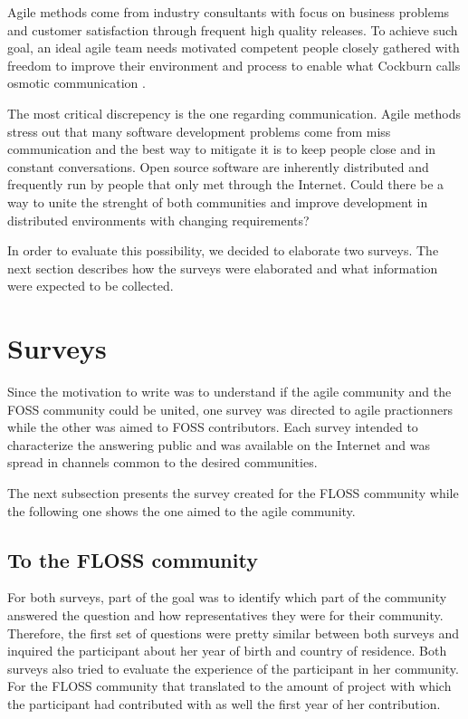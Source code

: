 \documentclass[lnbip]{svmultln}
\begin{document}
Agile methods come from industry consultants with focus on business
problems and customer satisfaction through frequent high quality
releases. To achieve such goal, an ideal agile team needs motivated
competent people closely gathered with freedom to improve their
environment and process to enable what Cockburn calls osmotic
communication \cite{cockburn2004}.

The most critical discrepency is the one regarding
communication. Agile methods stress out that many software development
problems come from miss communication and the best way to mitigate it
is to keep people close and in constant conversations. Open source
software are inherently distributed and frequently run by people that
only met through the Internet. Could there be a way to unite the
strenght of both communities and improve development in distributed
environments with changing requirements?

In order to evaluate this possibility, we decided to elaborate two
surveys. The next section describes how the surveys were elaborated
and what information were expected to be collected.

\section{Surveys}
\label{sec:surveys}

Since the motivation to write was to understand if the agile community
and the FOSS community could be united, one survey was directed to
agile practionners while the other was aimed to FOSS contributors.
Each survey intended to characterize the answering public and was
available on the Internet and was spread in channels common to the
desired communities.

The next subsection presents the survey created for the FLOSS
community while the following one shows the one aimed to the agile
community.

\subsection{To the FLOSS community}
\label{subsec:floss-survey}

For both surveys, part of the goal was to identify which part of the
community answered the question and how representatives they were for
their community. Therefore, the first set of questions were pretty
similar between both surveys and inquired the participant about her
year of birth and country of residence. Both surveys also tried to
evaluate the experience of the participant in her community. For the
FLOSS community that translated to the amount of project with which
the participant had contributed with as well the first year of her
contribution.
\end{document}
